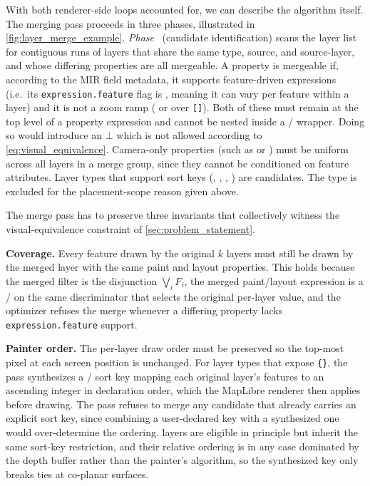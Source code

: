 With both renderer-side loops accounted for, we can describe the algorithm itself.
The merging pass proceeds in three phases, illustrated in \cref{fig:layer_merge_example}.
\emph{Phase}~ (candidate identification) scans the layer list for contiguous runs of layers that share the same type, source, and source-layer, and whose differing properties are all mergeable.
A property is mergeable if, according to the MIR field metadata,
  it supports feature-driven expressions (i.e.\ its \texttt{expression.feature} flag is , meaning it can vary per feature within a layer) and
  it is not a zoom ramp ( or  over \texttt{[]}).
  Both of these must remain at the top level of a property expression and cannot be nested inside a /  wrapper.
Doing so would introduce an $\bot$ which is not allowed according to \cref{eq:visual_equivalence}.
Camera-only properties (such as  or ) must be uniform across all layers in a merge group, since they cannot be conditioned on feature attributes.
Layer types that support sort keys (, , , ) are candidates.
The  type is excluded for the placement-scope reason given above.

The merge pass has to preserve three invariants that collectively witness the visual-equivalence constraint of \cref{sec:problem_statement}.

\textbf{Coverage.}
Every feature drawn by the original $k$ layers must still be drawn by the merged layer with the same paint and layout properties.
This holds because the merged filter is the disjunction $\bigvee_i F_i$, the merged paint/layout expression is a / on the same discriminator that selects the original per-layer value, and the optimizer refuses the merge whenever a differing property lacks \texttt{expression.feature} support.

\textbf{Painter order.}
The per-layer draw order must be preserved so the top-most pixel at each screen position is unchanged.
For layer types that expose \texttt{\{\}}, the pass synthesizes a / sort key mapping each original layer's features to an ascending integer in declaration order, which the MapLibre renderer then applies before drawing.
The pass refuses to merge any candidate that already carries an explicit sort key, since combining a user-declared key with a synthesized one would over-determine the ordering.
 layers are eligible in principle but inherit the same sort-key restriction, and their relative ordering is in any case dominated by the depth buffer rather than the painter's algorithm, so the synthesized key only breaks ties at co-planar surfaces.


